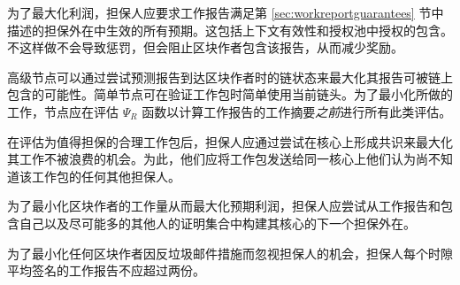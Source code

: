 为了最大化利润，担保人应要求工作报告满足第 \ref{sec:workreportguarantees} 节中描述的担保外在中生效的所有预期。这包括上下文有效性和授权池中授权的包含。不这样做不会导致惩罚，但会阻止区块作者包含该报告，从而减少奖励。

高级节点可以通过尝试预测报告到达区块作者时的链状态来最大化其报告可被链上包含的可能性。简单节点可在验证工作包时简单使用当前链头。为了最小化所做的工作，节点应在评估 $\Psi_R$ 函数以计算工作报告的工作摘要\emph{之前}进行所有此类评估。

在评估为值得担保的合理工作包后，担保人应通过尝试在核心上形成共识来最大化其工作不被浪费的机会。为此，他们应将工作包发送给同一核心上他们认为尚不知道该工作包的任何其他担保人。

为了最小化区块作者的工作量从而最大化预期利润，担保人应尝试从工作报告和包含自己以及尽可能多的其他人的证明集合中构建其核心的下一个担保外在。

为了最小化任何区块作者因反垃圾邮件措施而忽视担保人的机会，担保人每个时隙平均签名的工作报告不应超过两份。
